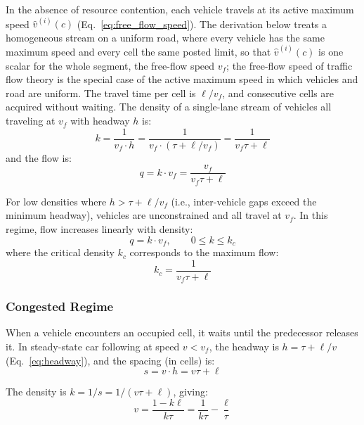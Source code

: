 \documentclass[review,number]{elsarticle}
\begin{document}
In the absence of resource contention, each vehicle travels at its active maximum speed $\hat{v}^{(i)}(c)$ (Eq.~\ref{eq:free_flow_speed}). The derivation below treats a homogeneous stream on a uniform road, where every vehicle has the same maximum speed and every cell the same posted limit, so that $\hat{v}^{(i)}(c)$ is one scalar for the whole segment, the free-flow speed $v_f$; the free-flow speed of traffic flow theory is the special case of the active maximum speed in which vehicles and road are uniform. The travel time per cell is $\ell / v_f$, and consecutive cells are acquired without waiting. The density of a single-lane stream of vehicles all traveling at $v_f$ with headway $h$ is:
\begin{equation}
    k = \frac{1}{v_f \cdot h} = \frac{1}{v_f \cdot (\tau + \ell / v_f)} = \frac{1}{v_f \tau + \ell}
    \label{eq:density_freeflow}
\end{equation}
and the flow is:
\begin{equation}
    q = k \cdot v_f = \frac{v_f}{v_f \tau + \ell}
    \label{eq:flow_freeflow}
\end{equation}

For low densities where $h > \tau + \ell / v_f$ (i.e., inter-vehicle gaps exceed the minimum headway), vehicles are unconstrained and all travel at $v_f$. In this regime, flow increases linearly with density:
\begin{equation}
    q = k \cdot v_f, \qquad 0 \leq k \leq k_c
    \label{eq:fd_freeflow}
\end{equation}
where the critical density $k_c$ corresponds to the maximum flow:
\begin{equation}
    k_c = \frac{1}{v_f \tau + \ell}
    \label{eq:critical_density}
\end{equation}

\subsubsection{Congested Regime}

When a vehicle encounters an occupied cell, it waits until the predecessor releases it. In steady-state car following at speed $v < v_f$, the headway is $h = \tau + \ell / v$ (Eq.~\ref{eq:headway}), and the spacing (in cells) is:
\begin{equation}
    s = v \cdot h = v\tau + \ell
    \label{eq:spacing_congested}
\end{equation}

The density is $k = 1/s = 1/(v\tau + \ell)$, giving:
\begin{equation}
    v = \frac{1 - k\ell}{k\tau} = \frac{1}{k\tau} - \frac{\ell}{\tau}
    \label{eq:speed_density_congested}
\end{equation}
\end{document}
